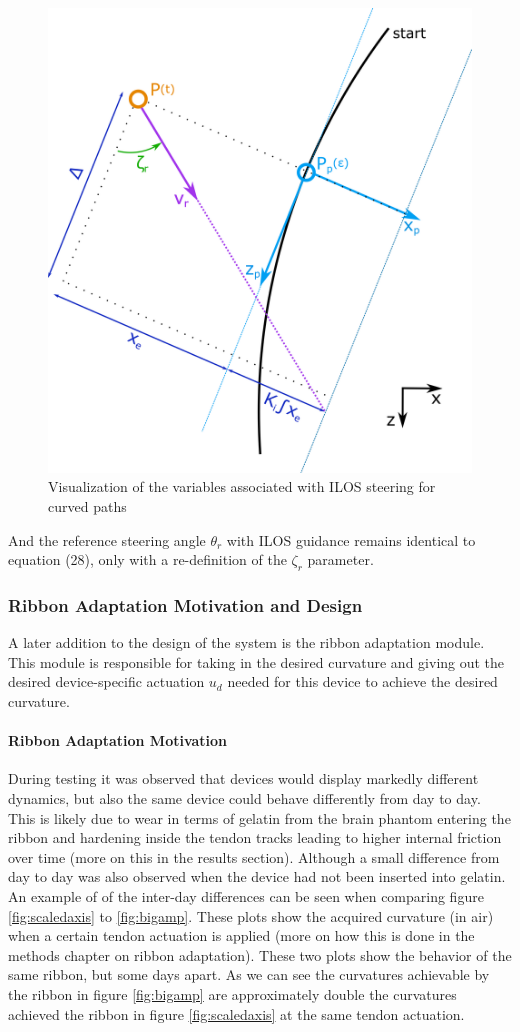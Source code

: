 \begin{figure} [H]
    \centering
    \includegraphics[width=0.65\linewidth]{images/inkscape/ILOS.png}
    \caption{Visualization of the variables associated with ILOS steering for curved paths}
    \label{fig:ilos}
\end{figure}

And the reference steering angle \(\theta_r\) with ILOS guidance remains identical to equation (28), only with a re-definition of the \(\zeta_r\) parameter.

\subsubsection{Ribbon Adaptation Motivation and Design}
A later addition to the design of the system is the ribbon adaptation module. This module is responsible for taking in the desired curvature and giving out the desired device-specific actuation \(u_d\) needed for this device to achieve the desired curvature. 

\paragraph*{Ribbon Adaptation Motivation}
During testing it was observed that devices would display markedly different dynamics, but also the same device could behave differently from day to day. This is likely due to wear in terms of gelatin from the brain phantom entering the ribbon and hardening inside the tendon tracks leading to higher internal friction over time (more on this in the results section). Although a small difference from day to day was also observed when the device had not been inserted into gelatin. An example of of the inter-day differences can be seen when comparing figure \ref{fig:scaledaxis} to \ref{fig:bigamp}. 
\newline \newline 
These plots show the acquired curvature (in air) when a certain tendon actuation is applied (more on how this is done in the methods chapter on ribbon adaptation). These two plots show the behavior of the same ribbon, but some days apart. As we can see the curvatures achievable by the ribbon in figure \ref{fig:bigamp} are approximately double the curvatures achieved the ribbon in figure \ref{fig:scaledaxis} at the same tendon actuation. 

